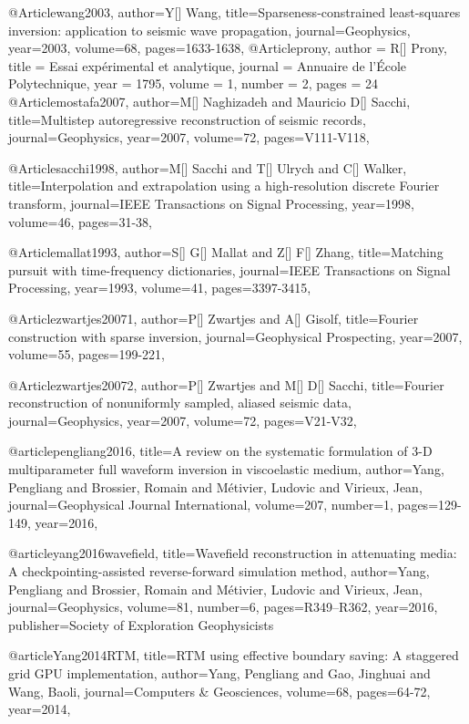 @Article{wang2003,
  author={Y[] Wang},
  title={Sparseness-constrained least-squares inversion: application to seismic wave propagation},
  journal={Geophysics},
  year=2003,
  volume=68,
  pages={1633-1638},
}
@Article{prony,
  author = 	 {R[] Prony},
  title = 	 {Essai exp\'{e}rimental et analytique},
  journal = 	 {Annuaire de l'\'{E}cole Polytechnique},
  year = 	 1795,
  volume = 	 1,
  number = 	 2,
  pages = 	 24}
@Article{mostafa2007,
  author={M[] Naghizadeh and Mauricio D[] Sacchi},
  title={Multistep autoregressive reconstruction of seismic records},
  journal={Geophysics},
  year=2007,
  volume=72,
  pages={V111-V118},
}

@Article{sacchi1998,
  author={M[] Sacchi and T[] Ulrych and C[] Walker},
  title={Interpolation and extrapolation using a high-resolution discrete {F}ourier transform},
  journal={IEEE Transactions on Signal Processing},
  year=1998,
  volume=46,
  pages={31-38},
}

@Article{mallat1993,
  author={S[] G[] Mallat and Z[] F[] Zhang},
  title={Matching pursuit with time-frequency dictionaries},
  journal={IEEE Transactions on Signal Processing},
  year=1993,
  volume=41,
  pages={3397-3415},
}

@Article{zwartjes20071,
  author={P[] Zwartjes and A[] Gisolf},
  title={{F}ourier construction with sparse inversion},
  journal={Geophysical Prospecting},
  year=2007,
  volume=55,
  pages={199-221},
}

@Article{zwartjes20072,
  author={P[] Zwartjes and M[] D[] Sacchi},
  title={{F}ourier reconstruction of nonuniformly sampled, aliased seismic data},
  journal={Geophysics},
  year=2007,
  volume=72,
  pages={V21-V32},
}

@article{pengliang2016,
  title={A review on the systematic formulation of 3-{D} multiparameter full waveform inversion in viscoelastic medium},
  author={Yang, Pengliang and Brossier, Romain and Métivier, Ludovic and Virieux, Jean},
  journal={Geophysical Journal International},
  volume={207},
  number={1},
  pages={129-149},
  year={2016},
}


@article{yang2016wavefield,
  title={Wavefield reconstruction in attenuating media: A checkpointing-assisted reverse-forward simulation method},
  author={Yang, Pengliang and Brossier, Romain and M{\'e}tivier, Ludovic and Virieux, Jean},
  journal={Geophysics},
  volume={81},
  number={6},
  pages={R349--R362},
  year={2016},
  publisher={Society of Exploration Geophysicists}
}


@article{Yang2014RTM,
  title={{RTM} using effective boundary saving: A staggered grid GPU implementation},
  author={Yang, Pengliang and Gao, Jinghuai and Wang, Baoli},
  journal={Computers \& Geosciences},
  volume={68},
  pages={64-72},
  year={2014},
}

